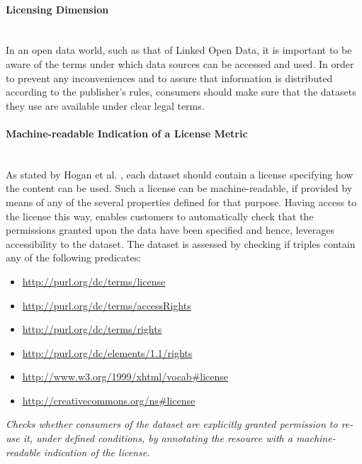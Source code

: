 
\paragraph{Licensing Dimension}~\\ %
In an open data world, such as that of Linked Open Data, it is important to be aware of the terms under which data sources can be accessed and used. In order to prevent any inconveniences and to assure that information is distributed according to the publisher's rules, consumers should make sure that the datasets they use are available under clear legal terms.

\paragraph{Machine-readable Indication of a License Metric} ~\\ %
As stated by Hogan et al. \cite{Hogan2012:LDC}, each dataset should contain a license specifying how the content can be used. Such a license can be machine-readable, if provided by means of any of the several properties defined for that purpose. Having access to the license this way, enables customers to automatically check that the permissions granted upon the data have been specified and hence, leverages accessibility to the dataset.
The dataset is assessed by checking if triples contain any of the following predicates:
\begin{itemize}
\item \url{http://purl.org/dc/terms/license}
\item \url{http://purl.org/dc/terms/accessRights}
\item \url{http://purl.org/dc/terms/rights}
\item \url{http://purl.org/dc/elements/1.1/rights}
\item \url{http://www.w3.org/1999/xhtml/vocab#license}
\item \url{http://creativecommons.org/ns#license}
\end{itemize}

\begin{mdframed}[style=metricdefinition]
\emph{Checks whether consumers of the dataset are explicitly granted permission to re-use it, under defined conditions, by annotating the resource with a machine-readable indication of the license.}
\end{mdframed}

